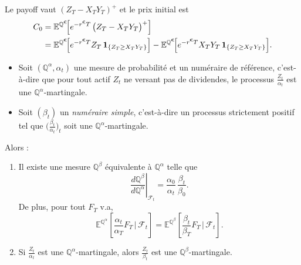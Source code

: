 
Le payoff vaut $(Z_T - X_T Y_T)^+$ et le prix initial est
\begin{align*}
C_0
  &= \mathbb{E}^{\mathbb{Q}^{\EUR}}\!\Big[e^{-r^{\EUR}T}\,\big(Z_T - X_TY_T\big)^+\Big]\\
  &= \mathbb{E}^{\mathbb{Q}^{\EUR}}\!\Big[e^{-r^{\EUR}T} Z_T\,\mathbf{1}_{\{Z_T\ge X_TY_T\}}\Big]
   - \mathbb{E}^{\mathbb{Q}^{\EUR}}\!\Big[e^{-r^{\EUR}T} X_TY_T\,\mathbf{1}_{\{Z_T\ge X_TY_T\}}\Big].
\end{align*}


\begin{rappelBox}
\begin{itemize}
    \item  Soit $(\mathbb{Q}^{\alpha},\alpha_t)$ une mesure de probabilité et un numéraire de référence,
c'est-à-dire que pour tout actif $Z_t$ ne versant pas de dividendes,
le processus $\displaystyle \frac{Z_t}{\alpha_t}$ est une $\mathbb{Q}^{\alpha}$-martingale.

\item  Soit $(\beta_t)$ un \emph{numéraire simple}, c'est-à-dire un processus strictement positif
tel que $\displaystyle \big( \frac{\beta_t}{\alpha_t} \big)_t$  soit une $\mathbb{Q}^{\alpha}$-martingale.

\end{itemize}


Alors :

\begin{enumerate}[label=\roman*)]
\item Il existe une mesure $\mathbb{Q}^{\beta}$ équivalente à $\mathbb{Q}^{\alpha}$ telle que
\[
\left.\frac{d\mathbb{Q}^{\beta}}{d\mathbb{Q}^{\alpha}}\right|_{\mathcal{F}_t}
= \frac{\alpha_0}{\alpha_t}\,\frac{\beta_t}{\beta_0}.
\]
De plus, pour tout $F_T$ v.a,
\[
\mathbb{E}^{\mathbb{Q}^{\alpha}}\!\left[
\frac{\alpha_t}{\alpha_T} F_T \,\bigg|\, \mathcal{F}_t
\right]
=
\mathbb{E}^{\mathbb{Q}^{\beta}}\!\left[
\frac{\beta_t}{\beta_T} F_T \,\bigg|\, \mathcal{F}_t
\right].
\]

\item Si $\displaystyle \frac{Z_t}{\alpha_t}$ est une $\mathbb{Q}^{\alpha}$-martingale,
alors $\displaystyle \frac{Z_t}{\beta_t}$ est une $\mathbb{Q}^{\beta}$-martingale.

\end{enumerate}
\end{rappelBox}


